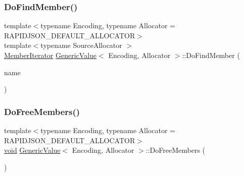 \mbox{\label{classGenericValue_a62e070232ca1bab936de08b8dbf41a5d}} 
\subsubsection{\texorpdfstring{Do\+Find\+Member()}{DoFindMember()}}
{\footnotesize\ttfamily template$<$typename Encoding, typename Allocator = R\+A\+P\+I\+D\+J\+S\+O\+N\+\_\+\+D\+E\+F\+A\+U\+L\+T\+\_\+\+A\+L\+L\+O\+C\+A\+T\+OR$>$ \\
template$<$typename Source\+Allocator $>$ \\
\hyperlink{classGenericValue_a349b8faae61edc42b4289726820be439}{Member\+Iterator} \hyperlink{classGenericValue}{Generic\+Value}$<$ Encoding, Allocator $>$\+::Do\+Find\+Member (\begin{DoxyParamCaption}\item[{const \hyperlink{classGenericValue}{Generic\+Value}$<$ Encoding, Source\+Allocator $>$ \&}]{name }\end{DoxyParamCaption})\hspace{0.3cm}{\ttfamily [inline]}}

\mbox{\label{classGenericValue_aab3a51f8207a44ad87a1f8b0bbf53fe9}} 
\subsubsection{\texorpdfstring{Do\+Free\+Members()}{DoFreeMembers()}}
{\footnotesize\ttfamily template$<$typename Encoding, typename Allocator = R\+A\+P\+I\+D\+J\+S\+O\+N\+\_\+\+D\+E\+F\+A\+U\+L\+T\+\_\+\+A\+L\+L\+O\+C\+A\+T\+OR$>$ \\
\hyperlink{imgui__impl__opengl3__loader_8h_ac668e7cffd9e2e9cfee428b9b2f34fa7}{void} \hyperlink{classGenericValue}{Generic\+Value}$<$ Encoding, Allocator $>$\+::Do\+Free\+Members (\begin{DoxyParamCaption}{ }\end{DoxyParamCaption})\hspace{0.3cm}{\ttfamily [inline]}}

\mbox{\label{classGenericValue_a6db9c0ed0d2417d00b135195e3546f50}} 
